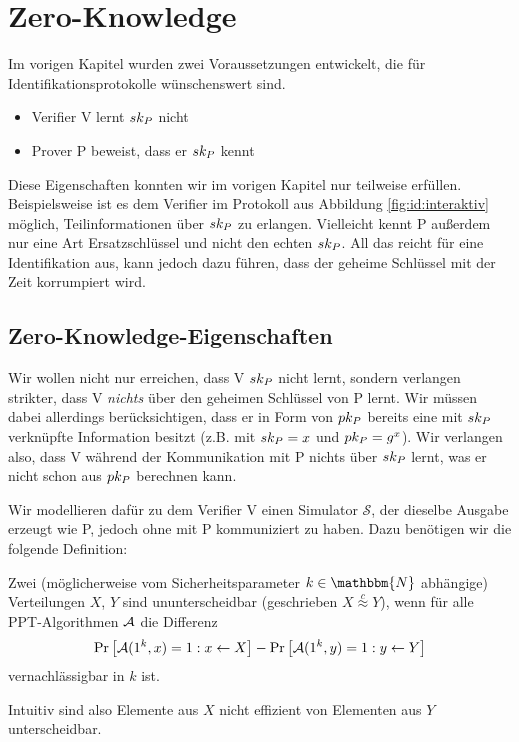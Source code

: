 \chapter{Zero-Knowledge}
Im vorigen Kapitel wurden zwei Voraussetzungen entwickelt, die für
Identifikationsprotokolle wünschenswert sind.
\begin{itemize}
  \item Verifier V lernt $sk_P$ nicht
  \item Prover P beweist, dass er $sk_P$ kennt
\end{itemize}
Diese Eigenschaften konnten wir im vorigen Kapitel nur teilweise
erfüllen. Beispielsweise ist es dem Verifier im Protokoll aus Abbildung
\ref{fig:id:interaktiv} möglich, Teilinformationen über $sk_P$ zu
erlangen. Vielleicht kennt P außerdem nur eine Art Ersatzschlüssel und
nicht den echten $sk_P$. All das reicht für eine Identifikation aus,
kann jedoch dazu führen, dass der geheime Schlüssel mit der Zeit
korrumpiert wird.

\section{Zero-Knowledge-Eigenschaften}
Wir wollen nicht nur erreichen, dass V $sk_P$ nicht lernt, sondern
verlangen strikter, dass V \emph{nichts} über den geheimen Schlüssel von
P lernt. Wir müssen dabei allerdings berücksichtigen, dass er in Form
von $pk_P$ bereits eine mit $sk_P$ verknüpfte Information besitzt
(z.B.  mit $sk_P = x$ und $pk_P = g^x$). Wir verlangen also, dass
V während der Kommunikation mit P nichts über $sk_P$ lernt, was er
nicht schon aus $pk_P$ berechnen kann.

Wir modellieren dafür zu dem Verifier V einen Simulator $\mathcal{S}$,
der dieselbe Ausgabe erzeugt wie P, jedoch ohne mit P kommuniziert zu
haben. Dazu benötigen wir die folgende Definition:
\begin{definition}\label{def:zk:ununterscheidbarkeit}
  Zwei (möglicherweise vom Sicherheitsparameter $k \in \mathbbm{N}$ abhängige) Verteilungen $X$, $Y$ sind ununterscheidbar (geschrieben $X
  \stackrel{c}\approx Y$), wenn für alle PPT-Algorithmen $\mathcal{A}$ die Differenz
  \[
    \Pr \left[ \mathcal{A}(1^k,x) = 1 : x \leftarrow X \right] - \Pr \left[ \mathcal{A}(1^k, y) = 1 : y \leftarrow Y \right]
  \]
  vernachlässigbar in $k$ ist.
\end{definition}
Intuitiv sind also Elemente aus $X$ nicht effizient von Elementen aus $Y$ unterscheidbar.

